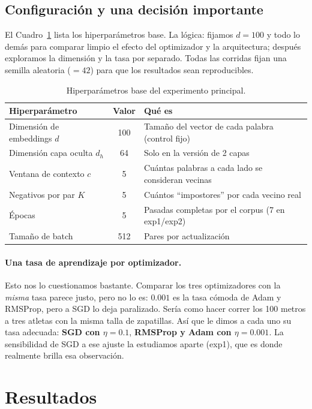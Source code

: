 \documentclass[11pt]{article}
\begin{document}
\subsection{Configuración y una decisión importante}
El Cuadro~\ref{tab:hparams} lista los hiperparámetros base. La lógica: fijamos $d=100$ y todo
lo demás para comparar limpio el efecto del optimizador y la arquitectura; después
exploramos la dimensión y la tasa por separado. Todas las corridas fijan una semilla aleatoria
($=42$) para que los resultados sean reproducibles.
\begin{table}[H]
\centering
\caption{Hiperparámetros base del experimento principal.}\label{tab:hparams}
\begin{tabular}{lcl}
\toprule
Hiperparámetro & Valor & Qué es \\
\midrule
Dimensión de embeddings $d$ & 100 & Tamaño del vector de cada palabra (control fijo) \\
Dimensión capa oculta $d_h$ & 64 & Solo en la versión de 2 capas \\
Ventana de contexto $c$ & 5 & Cuántas palabras a cada lado se consideran vecinas \\
Negativos por par $K$ & 5 & Cuántos ``impostores'' por cada vecino real \\
Épocas & 5 & Pasadas completas por el corpus (7 en exp1/exp2) \\
Tamaño de batch & 512 & Pares por actualización \\
\bottomrule
\end{tabular}
\end{table}

\paragraph{Una tasa de aprendizaje por optimizador.} Esto nos lo cuestionamos bastante.
Comparar los tres optimizadores con la \emph{misma} tasa parece justo, pero no lo es: $0.001$
es la tasa cómoda de Adam y RMSProp, pero a SGD lo deja paralizado. Sería como hacer correr
los 100 metros a tres atletas con la misma talla de zapatillas. Así que le dimos a cada uno
su tasa adecuada: \textbf{SGD con $\eta=0.1$}, \textbf{RMSProp y Adam con $\eta=0.001$}. La
sensibilidad de SGD a ese ajuste la estudiamos aparte (exp1), que es donde realmente brilla
esa observación.

\section{Resultados}\label{sec:resultados}
\end{document}
